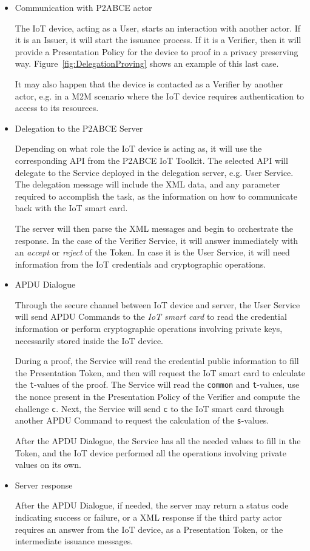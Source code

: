 \begin{itemize}
	\item Communication with P2ABCE actor
	
	The IoT device, acting as a User, starts an interaction with another actor. If it is an Issuer, it will start the issuance process. If it is a Verifier, then it will provide a Presentation Policy for the device to proof in a privacy preserving way. Figure~\ref{fig:DelegationProving} shows an example of this last case.
	
	It may also happen that the device is contacted as a Verifier by another actor, e.g. in a M2M scenario where the IoT device requires authentication to access to its resources.
	
	\item Delegation to the P2ABCE Server
	
	Depending on what role the IoT device is acting as, it will use the corresponding API from the P2ABCE IoT Toolkit. The selected API will delegate to the Service deployed in the delegation server, e.g. User Service. The delegation message will include the XML data, and any parameter required to accomplish the task, as the information on how to communicate back with the IoT smart card.
	
	The server will then parse the XML messages and begin to orchestrate the response. In the case of the Verifier Service, it will answer immediately with an \textit{accept} or \textit{reject} of the Token. In case it is the User Service, it will need information from the IoT credentials and cryptographic operations.
	
	\item APDU Dialogue
	
	Through the secure channel between IoT device and server, the User Service will send APDU Commands to the  \textit{IoT smart card} to read the credential information or perform cryptographic operations involving private keys, necessarily stored inside the IoT device.
	
	During a proof, the Service will read the credential public information to fill the Presentation Token, and then will request the IoT smart card to calculate the \texttt{t}-values of the proof. The Service will read the \texttt{common} and \texttt{t}-values, use the nonce present in the Presentation Policy of the Verifier and compute the challenge \texttt{c}. Next, the Service will send \texttt{c} to the IoT smart card through another APDU Command to request the calculation of the \texttt{s}-values.
	
	After the APDU Dialogue, the Service has all the needed values to fill in the Token, and the IoT device performed all the operations involving private values on its own.
	
	
	\item Server response
	
	After the APDU Dialogue, if needed, the server may return a status code indicating success or failure, or a XML response if the third party actor requires an answer from the IoT device, as a Presentation Token, or the intermediate issuance messages.
	
\end{itemize}

